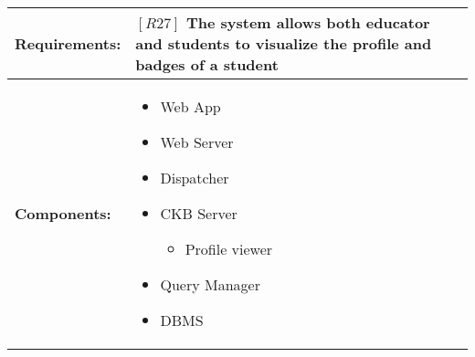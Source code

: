 \begin{table}[H]
  \centering
  \begin{tabularx}{\textwidth}{|p{3cm}|X|}
    \hline
    \textbf{Requirements:} &
    $[R27]$ The system allows both educator and students to visualize the profile and badges of a student 
    \\
    \hline
    \textbf{Components:} & 
    \begin{itemize}
        \item Web App
        \item Web Server 
        \item Dispatcher
        \item CKB Server 
        \begin{itemize}
            \item Profile viewer
        \end{itemize}
        \item Query Manager 
        \item DBMS
    \end{itemize}
    \\
    \hline
  \end{tabularx}
\end{table}
